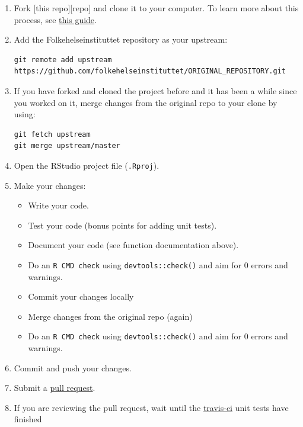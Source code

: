 \documentclass[12pt,]{article}
\providecommand{\tightlist}{%
  \setlength{\itemsep}{0pt}\setlength{\parskip}{0pt}}
\begin{document}
\begin{enumerate}
\def\labelenumi{\arabic{enumi}.}
\item
  Fork {[}this repo{]}{[}repo{]} and clone it to your computer. To learn
  more about this process, see
  \href{https://guides.github.com/activities/forking/}{this guide}.
\item
  Add the Folkehelseinstituttet repository as your upstream:

\begin{verbatim}
git remote add upstream https://github.com/folkehelseinstituttet/ORIGINAL_REPOSITORY.git
\end{verbatim}
\item
  If you have forked and cloned the project before and it has been a
  while since you worked on it, merge changes from the original repo to
  your clone by using:

\begin{verbatim}
git fetch upstream
git merge upstream/master
\end{verbatim}
\item
  Open the RStudio project file (\texttt{.Rproj}).
\item
  Make your changes:

  \begin{itemize}
  \tightlist
  \item
    Write your code.
  \item
    Test your code (bonus points for adding unit tests).
  \item
    Document your code (see function documentation above).
  \item
    Do an \texttt{R\ CMD\ check} using \texttt{devtools::check()} and
    aim for 0 errors and warnings.
  \item
    Commit your changes locally
  \item
    Merge changes from the original repo (again)
  \item
    Do an \texttt{R\ CMD\ check} using \texttt{devtools::check()} and
    aim for 0 errors and warnings.
  \end{itemize}
\item
  Commit and push your changes.
\item
  Submit a
  \href{https://guides.github.com/activities/forking/\#making-a-pull-request}{pull
  request}.
\item
  If you are reviewing the pull request, wait until the
  \href{www.travis-ci.org}{travis-ci} unit tests have finished
\end{enumerate}
\end{document}
